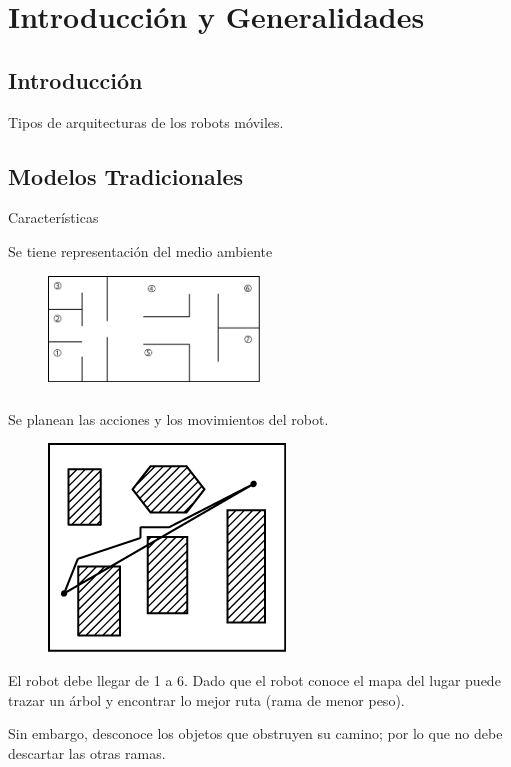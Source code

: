 \chapter{Introducción y Generalidades}

\section{Introducción}
Tipos de arquitecturas de los robots móviles.

\section{Modelos Tradicionales}
Características

Se tiene representación del medio ambiente

\begin{figure}[h!]
	\centering
	\includegraphics[width=0.5\textwidth]{images/img1.png}
	\label{figura1}
\end{figure}

\paragraph{}
Se planean las acciones y los movimientos del robot.

\begin{figure}
  \begin{center}
    \includegraphics[width = 2 cm]{images/img2.png}
  \end{center}    
\end{figure}

El robot debe llegar de 1 a 6. Dado que el robot conoce el mapa del lugar puede trazar un árbol y encontrar lo mejor ruta (rama de menor peso).

Sin embargo, desconoce los objetos que obstruyen su camino; por lo que no debe descartar las otras ramas.

